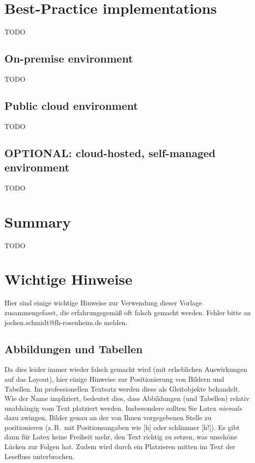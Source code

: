 \chapter{Best-Practice implementations}
TODO

\section{On-premise environment}
TODO

\section{Public cloud environment}
TODO

\section{OPTIONAL: cloud-hosted, self-managed environment}
TODO

\chapter{Summary}
TODO





























\chapter{Wichtige Hinweise}
\label{c:intro}

Hier sind einige wichtige Hinweise zur Verwendung dieser Vorlage zusammengefasst, die erfahrungsgemäß oft falsch gemacht werden.
Fehler bitte an jochen.schmidt@fh-rosenheim.de melden.


\section{Abbildungen und Tabellen}
\label{s:intro:abc}

Da dies leider immer wieder falsch gemacht wird (mit erheblichen Auswirkungen auf das Layout), hier einige Hinweise zur Positionierung von Bildern und Tabellen.
Im professionellen Textsatz werden diese als Gleitobjekte behandelt.
Wie der Name impliziert, bedeutet dies, dass Abbildungen (und Tabellen) relativ unabhängig vom Text platziert werden.
Insbesondere sollten Sie Latex \emph{niemals} dazu zwingen, Bilder genau an der von Ihnen vorgegebenen Stelle zu positionieren (z.\,B.\ mit Positionsangaben wie [h] oder schlimmer [h!]).
Es gibt dann für Latex keine Freiheit mehr, den Text richtig zu setzen, was unschöne Lücken zur Folgen hat.
Zudem wird durch ein Platzieren mitten im Text der Lesefluss unterbrochen.

